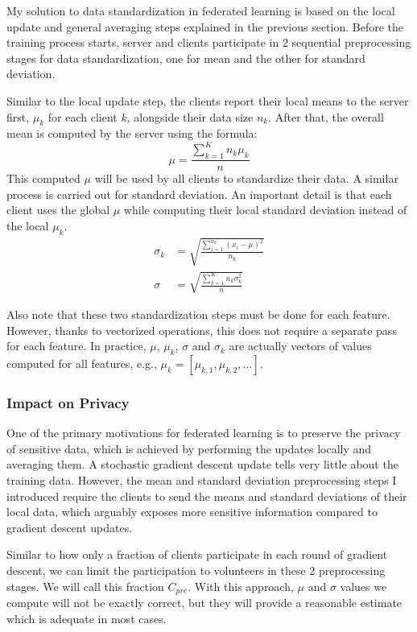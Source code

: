 My solution to data standardization in federated learning is based on the local update and general averaging steps explained in the previous section.
Before the training process starts, server and clients participate in 2 sequential preprocessing stages for data standardization, one for mean and the other for standard deviation.

Similar to the local update step, the clients report their local means to the server first, $\mu_k$ for each client $k$, alongside their data size $n_k$.
After that, the overall mean is computed by the server using the formula:
\begin{equation}
    \mu = \frac{\sum_{k=1}^K n_k \mu_k}{n}
\end{equation}
This computed $\mu$ will be used by all clients to standardize their data.
A similar process is carried out for standard deviation.
An important detail is that each client uses the global $\mu$ while computing their local standard deviation instead of the local $\mu_k$. 
\begin{align}
    \sigma_k & = \sqrt{\frac{\sum_{i=1}^{n_k} (x_i - \mu)^2}{n_k}} \\
    \sigma & = \sqrt{\frac{\sum_{k=1}^{K} n_k \sigma_k^2}{n}}
\end{align}

Also note that these two standardization steps must be done for each feature.
However, thanks to vectorized operations, this does not require a separate pass for each feature.
In practice, $\mu$, $\mu_k$, $\sigma$ and $\sigma_k$ are actually vectors of values computed for all features, e.g., $\mu_k = [\mu_{k, 1}, \mu_{k,2}, \ldots]$.


\subsubsection{Impact on Privacy}

One of the primary motivations for federated learning is to preserve the privacy of sensitive data, which is achieved by performing the updates locally and averaging them.
A stochastic gradient descent update tells very little about the training data.
However, the mean and standard deviation preprocessing steps I introduced require the clients to send the means and standard deviations of their local data, which arguably exposes more sensitive information compared to gradient descent updates.

Similar to how only a fraction of clients participate in each round of gradient descent, we can limit the participation to volunteers in these 2 preprocessing stages.
We will call this fraction $C_{pre}$.
With this approach, $\mu$ and $\sigma$ values we compute will not be exactly correct, but they will provide a reasonable estimate which is adequate in most cases.

